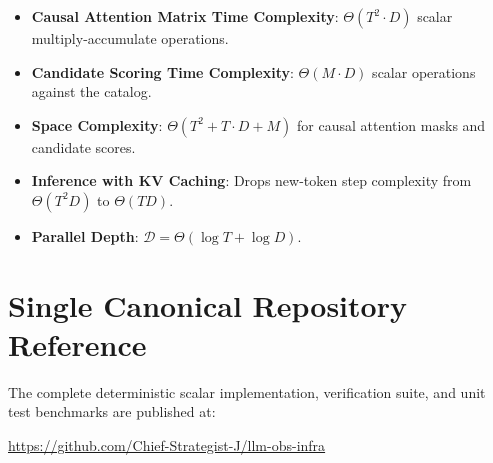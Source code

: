 \documentclass[11pt,a4paper]{article}
\theoremstyle{definition}
\begin{document}
\begin{itemize}
    \item \textbf{Causal Attention Matrix Time Complexity}: $\Theta(T^2 \cdot D)$ scalar multiply-accumulate operations.
    \item \textbf{Candidate Scoring Time Complexity}: $\Theta(M \cdot D)$ scalar operations against the catalog.
    \item \textbf{Space Complexity}: $\Theta(T^2 + T \cdot D + M)$ for causal attention masks and candidate scores.
    \item \textbf{Inference with KV Caching}: Drops new-token step complexity from $\Theta(T^2 D)$ to $\Theta(T D)$.
    \item \textbf{Parallel Depth}: $\mathcal{D} = \Theta(\log T + \log D)$.
\end{itemize}

\section{Single Canonical Repository Reference}

The complete deterministic scalar implementation, verification suite, and unit test benchmarks are published at:
\begin{center}
\url{https://github.com/Chief-Strategist-J/llm-obs-infra}
\end{center}
\end{document}
